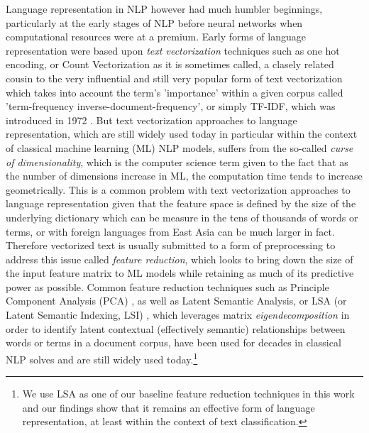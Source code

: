 \documentclass[final]{clv2025}
\begin{document}
Language representation in NLP however had much humbler beginnings, particularly at the early stages of NLP before neural networks when computational resources were at a premium. Early forms of language representation were based upon \textit{text vectorization} techniques such as one hot encoding, or Count Vectorization as it is sometimes called, a clasely related cousin to the very influential and still very popular form of text vectorization which takes into account the term's 'importance' within a given corpus called 'term-frequency inverse-document-frequency', or simply TF-IDF, which was introduced in 1972 \cite{sparckjones1972statistical}. But text vectorization approaches to language representation, which are still widely used today in particular within the context of classical machine learning (ML) NLP models, suffers from the so-called \textit{curse of dimensionality}, which is the computer science term given to the fact that as the number of dimensions increase in ML, the computation time tends to increase geometrically. This is a common problem with text vectorization approaches to language representation given that the feature space is defined by the size of the underlying dictionary which can be measure in the tens of thousands of words or terms, or with foreign languages from East Asia can be much larger in fact. Therefore vectorized text is usually submitted to a form of preprocessing to address this issue called \textit{feature reduction}, which looks to bring down the size of the input feature matrix to ML models while retaining as much of its predictive power as possible. Common feature reduction techniques such as Principle Component Analysis (PCA) \cite{pearson01111901} \cite{hotelling1933AnalysisOA}, as well as Latent Semantic Analysis, or LSA (or Latent Semantic Indexing, LSI) \cite{deerwester}, which leverages matrix \textit{eigendecomposition} in order to identify latent contextual (effectively semantic) relationships between words or terms in a document corpus, have been used for decades in classical NLP solves and are still widely used today.\footnote{We use LSA as one of our baseline feature reduction techniques in this work and our findings show that it remains an effective form of language representation, at least within the context of text classification.}
\end{document}

